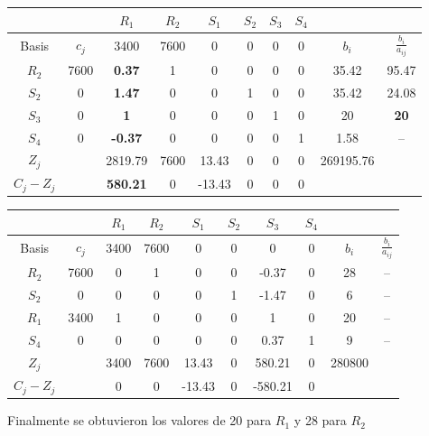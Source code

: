 \documentclass[]{article}
\begin{document}
\begin{table}[!htb]
    \centering
    \begin{tabular}{c|c|c|c|c|c|c|c|c|c} %
         & & $R_1$ & $R_2$ & $S_1$ & $S_2$ & $S_3$ & $S_4$ & & \\ \hline
        Basis & $c_j$ & 3400 & 7600 & 0 & 0 & 0 & 0 & $b_i$ & $\frac{b_i}{a_{ij}}$\\ \hline
        $R_2$ & 7600 & \textbf{0.37} & 1 & 0 & 0 & 0 & 0 & 35.42 & 95.47\\ \hline
        $S_2$ & 0 & \textbf{1.47} & 0 & 0 & 1 & 0 & 0 & 35.42 & 24.08\\ \hline
        $S_3$ & 0 & \textbf{1} & 0 & 0 & 0 & 1 & 0 & 20 & \textbf{20}\\ \hline
        $S_4$ & 0 & \textbf{-0.37} & 0 & 0 & 0 & 0 & 1 & 1.58 & --\\ \hline
        $Z_j$ & & 2819.79 & 7600 & 13.43 & 0 & 0 & 0 & 269195.76 & \\
        $C_j-Z_j$ & & \textbf{580.21} & 0 & -13.43 & 0 & 0 & 0 & & \\
    \end{tabular}
\end{table}

\begin{table}[!htb]
    \centering
    \begin{tabular}{c|c|c|c|c|c|c|c|c|c} %
         & & $R_1$ & $R_2$ & $S_1$ & $S_2$ & $S_3$ & $S_4$ & & \\ \hline
        Basis & $c_j$ & 3400 & 7600 & 0 & 0 & 0 & 0 & $b_i$ & $\frac{b_i}{a_{ij}}$\\ \hline
        $R_2$ & 7600 & 0 & 1 & 0 & 0 & -0.37 & 0 & 28 & --\\ \hline
        $S_2$ & 0 & 0 & 0 & 0 & 1 & -1.47 & 0 & 6 & --\\ \hline
        $R_1$ & 3400 & 1 & 0 & 0 & 0 & 1 & 0 & 20 & --\\ \hline
        $S_4$ & 0 & 0 & 0 & 0 & 0 & 0.37 & 1 & 9 & --\\ \hline
        $Z_j$ & & 3400 & 7600 & 13.43 & 0 & 580.21 & 0 & 280800 & \\
        $C_j-Z_j$ & & 0 & 0 & -13.43 & 0 & -580.21 & 0 & & \\
    \end{tabular}
\end{table}
Finalmente se obtuvieron los valores de 20 para $R_1$ y 28 para $R_2$
\newpage
\end{document}
